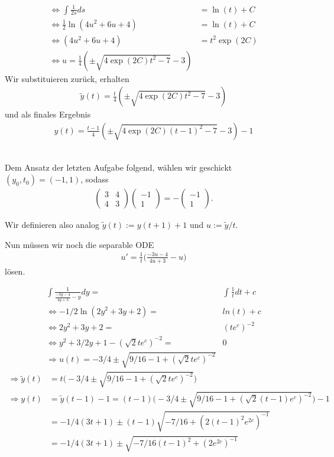 \begin{solution}
\begin{align*}
  \iff \int \frac{1}{2s} ds &= \ln(t) + C \\
  \iff \frac{1}{2}\ln(4u^2 + 6u + 4) &= \ln(t) + C \\
  \iff (4u^2 + 6u + 4) &= t^2\exp(2C)\\
  \iff u = \frac{1}{4}\left(\pm\sqrt{4\exp(2C)t^2 - 7} - 3\right)
\end{align*}
Wir substituieren zurück, erhalten
\begin{align*}
  \widetilde{y}(t) = \frac{t}{4}\left(\pm\sqrt{4\exp(2C)t^2 - 7} - 3\right)
\end{align*}
und als finales Ergebnis
\begin{align*}
  y(t) = \frac{t-1}{4}\left(\pm\sqrt{4\exp(2C)(t-1)^2 - 7} - 3\right) - 1
\end{align*}
\\
\end{solution}
\begin{solution}
  Dem Ansatz der letzten Aufgabe folgend, wählen wir geschickt $(y_0,t_0) = (-1,1)$, sodass
  \begin{align*}
  \begin{pmatrix}
    3 & 4 \\ 4 & 3
  \end{pmatrix}\left(
  \begin{array}{c}
    -1 \\
    1
  \end{array}
  \right) = -\left(
  \begin{array}{c}
    -1 \\
    1
  \end{array}
  \right).
  \end{align*}

  Wir definieren also analog $\tilde{y}(t) := y(t+1)+1$ und $u := \tilde{y}/t$.

  Nun müssen wir noch die separable ODE
  \begin{align*}
    u' = \frac{1}{t} \bigg(\frac{-3 u -4}{4u+3}-u\bigg)
  \end{align*}
  lösen.

  \begin{align*}
    \int \frac{1}{\frac{-3y-4}{4y+3}-y}dy =& \int \frac{1}{t} dt + c \\
    \Leftrightarrow -1/2 \ln(2y^2 +3y + 2) =& ln(t) + c \\
    \Leftrightarrow 2y^2 +3y + 2 =& (te^c)^{-2} \\
    \Leftrightarrow y^2 +3/2y + 1 - (\sqrt{2} te^c)^{-2} =& 0 \\
    \Rightarrow u(t) = -3/4 \pm \sqrt{9/16 - 1 + (\sqrt{2} te^c)^{-2}}
  \end{align*}
  \begin{align*}
    \Rightarrow \tilde{y}(t) &= t \bigg(-3/4 \pm \sqrt{9/16 - 1 + (\sqrt{2} te^c)^{-2}}\bigg) \\
    \Rightarrow y(t) &= \tilde{y}(t-1) -1 = (t-1) \bigg(-3/4 \pm \sqrt{9/16 - 1 + (\sqrt{2} (t-1)e^c)^{-2}}\bigg) - 1 \\
    &= -1/4 (3t+1) \pm (t-1) \sqrt{-7/16 + (2 (t-1)^2 e^{2c})^{-1}} \\
    &= -1/4 (3t+1) \pm \sqrt{-7/16(t-1)^2 + (2e^{2c})^{-1}}
  \end{align*}
\end{solution}
